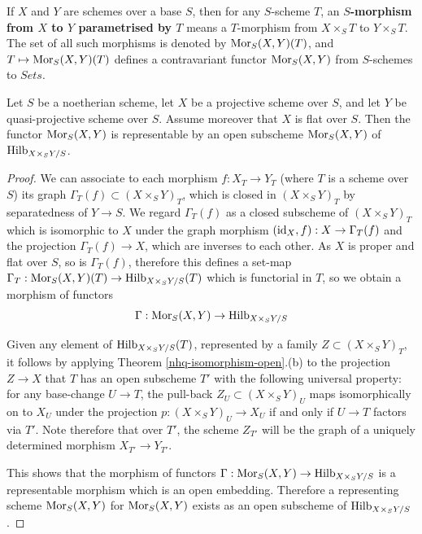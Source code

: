 \medskip

\begin{definition}\label{nhq-parametrized-s-morphism}
If $X$ and $Y$ are schemes over a base $S$, then for any $S$-scheme $T$,
an \textbf{$S$-morphism from $X$ to $Y$ parametrised by $T$} means a
$T$-morphism from $X\times_ST$ to $Y\times_ST$. The set of all such
morphisms is denoted by $\operatorname{Mor}_S(X,Y)(T)$, and
$T\mapsto\operatorname{Mor}_S(X,Y)(T)$ defines a contravariant functor
$\operatorname{Mor}_S(X,Y)$ from $S$-schemes to $Sets$.
\end{definition}


\medskip



\begin{theorem}\label{nhq-morphism-scheme}
Let $S$ be a noetherian scheme, let $X$ be a projective scheme over $S$,
and let $Y$ be quasi-projective scheme
over $S$. Assume moreover that $X$ is flat over $S$. Then the
functor $\operatorname{Mor}_S(X,Y)$ is representable by an open
subscheme $\operatorname{Mor}_S(X,Y)$ of $\operatorname{Hilb}_{X\times_SY/S}$.
\end{theorem}

\begin{proof} We can associate
to each morphism $f : X_T \to Y_T$ (where $T$ is a scheme over $S$)
its graph $\Gamma_T(f) \subset (X\times_SY)_T$, which is
closed in $(X\times_SY)_T$ by separatedness of $Y\to S$.
We regard $\Gamma_T(f)$ as a closed subscheme of $(X\times_SY)_T$
which is isomorphic to $X$ under the graph morphism
$(\operatorname{id}_X,f): X \to  \Gamma_T(f)$ and the projection $\Gamma_T(f) \to X$,
which are inverses to each other.
As $X$ is proper and flat over $S$, so is $\Gamma_T(f)$, therefore
this defines a set-map $\Gamma_T : \operatorname{Mor}_S(X,Y)(T) \to
\operatorname{Hilb}_{X\times_SY/S}(T)$ which is functorial in $T$, so
we obtain a morphism of functors
$$\Gamma : \operatorname{Mor}_S(X,Y) \to \operatorname{Hilb}_{X\times_SY/S}$$


Given any element of $\operatorname{Hilb}_{X\times_SY/S}(T)$, represented by a
family $Z \subset (X\times_SY)_T$, it follows by applying
Theorem \ref{nhq-isomorphism-open}.(b) to
the projection $Z\to X$ that $T$ has an open subscheme
$T'$ with the following universal property: for any
base-change $U \to T$, the pull-back $Z_U\subset (X\times_SY)_U$
maps isomorphically on to $X_U$ under the projection
$p : (X\times_SY)_U\to X_U$ if and only if $U\to T$ factors via
$T'$. Note therefore that over $T'$,
the scheme $Z_{T'}$ will be the graph of a uniquely determined
morphism $X_{T'} \to Y_{T'}$.

This shows that the morphism of functors
$\Gamma : \operatorname{Mor}_S(X,Y) \to \operatorname{Hilb}_{X\times_SY/S}$
is a representable morphism which is an open embedding.
Therefore a representing scheme
$\operatorname{Mor}_S(X,Y)$ for $\operatorname{Mor}_S(X,Y)$ exists as an open
subscheme of $\operatorname{Hilb}_{X\times_SY/S}$. \end{proof}




